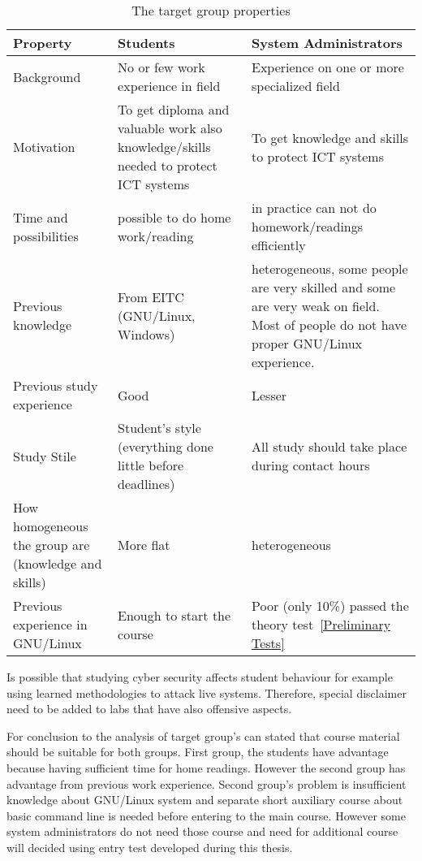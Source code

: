 \begin{table}[h]
\centering
\caption{The target group properties}

\begin{tabular}{|p{4cm}|p{5cm}|p{5cm}|}
\hline 
\color{blue}
Property & \color{blue} Students & \color{blue} System Administrators \\ 
\hline 
Background & No or few work experience in field & Experience on one or more specialized field \\ 
\hline 
Motivation & To get diploma and valuable work also knowledge/skills needed to protect \gls{ICT} systems & To get knowledge and skills to protect \gls{ICT} systems \\ 
\hline 
Time and possibilities & possible to do home work/reading & in practice can not do homework/readings efficiently  \\ 
\hline 
Previous knowledge & From \gls{EITC} (GNU/Linux, Windows)  &  heterogeneous, some people are very skilled and some are very weak on field. Most of people do not have proper GNU/Linux experience.  \\ 
\hline 
Previous study experience & Good & Lesser \\ 
\hline 
Study Stile & Student's style (everything done little before deadlines) & All study should take place during contact hours  \\ 
\hline 
How homogeneous the group are (knowledge and skills) & More flat & heterogeneous \\ 
\hline 
Previous experience in GNU/Linux & Enough to start the course & Poor (only 10\%) passed the theory test~\ref{Preliminary Tests}  \\ 
\hline 
\end{tabular} 

\label{tab:targetgroup}
\end{table}
 
Is possible that studying cyber security affects student behaviour for example using learned methodologies to attack live systems. Therefore, special disclaimer need to be added to labs that have also offensive aspects.
 
For conclusion to the analysis of target group's can stated that course material should be suitable for both groups. First group, the students have advantage because having sufficient time for home readings. However the second group has advantage from previous work experience. Second group's problem is insufficient knowledge about GNU/Linux system and separate short auxiliary course about basic command line is needed before entering to the main course. However some system administrators do not need those course and need for additional course will decided using entry test developed during this thesis.


